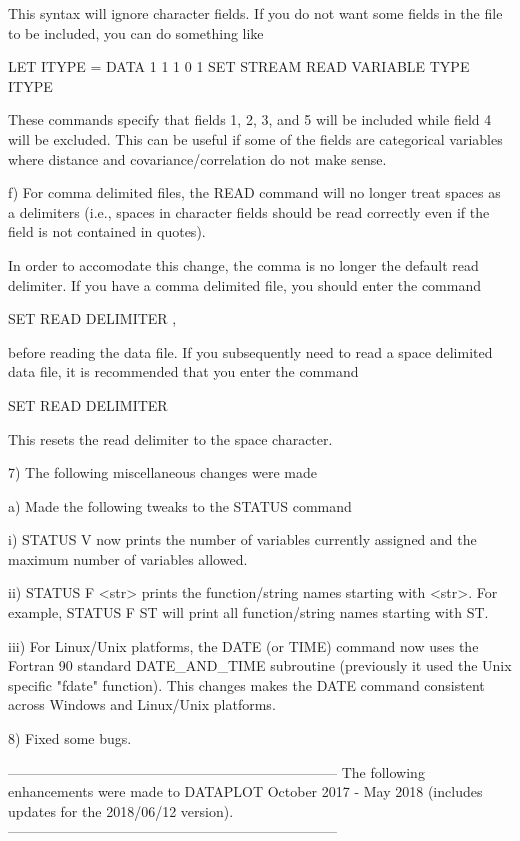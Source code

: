              This syntax will ignore character fields.  If you do not
             want some fields in the file to be included, you can do
             something like

                 LET ITYPE = DATA 1 1 1 0 1
                 SET STREAM READ VARIABLE TYPE ITYPE

             These commands specify that fields 1, 2, 3, and 5 will be
             included while field 4 will be excluded.  This can be useful
             if some of the fields are categorical variables where
             distance and covariance/correlation do not make sense.
 
    f) For comma delimited files, the READ command will no longer treat
       spaces as a delimiters (i.e., spaces in character fields should be
       read correctly even if the field is not contained in quotes).

       In order to accomodate this change, the comma is no longer the
       default read delimiter.  If you have a comma delimited file, you
       should enter the command

           SET READ DELIMITER ,

       before reading the data file.  If you subsequently need to read
       a space delimited data file, it is recommended that you enter the
       command

           SET READ DELIMITER

       This resets the read delimiter to the space character.

 7) The following miscellaneous changes were made

    a) Made the following tweaks to the STATUS command

        i) STATUS V now prints the number of variables currently
           assigned and the maximum number of variables allowed.

       ii) STATUS F <str> prints the function/string names starting with
           <str>.  For example, STATUS F ST will print all function/string
           names starting with ST.

      iii) For Linux/Unix platforms, the DATE (or TIME) command now
           uses the Fortran 90 standard DATE_AND_TIME subroutine
           (previously it used the Unix specific "fdate" function).
           This changes makes the DATE command consistent across
           Windows and Linux/Unix platforms.

 8) Fixed some bugs.

-----------------------------------------------------------------------
The following enhancements were made to DATAPLOT
October 2017 - May 2018 (includes updates for the 2018/06/12 version).
-----------------------------------------------------------------------

